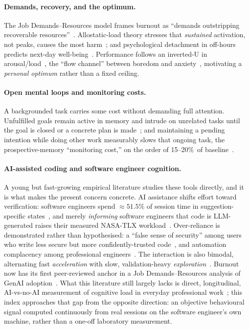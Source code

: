 \documentclass[10pt,twocolumn]{article}
\begin{document}
\paragraph{Demands, recovery, and the optimum.} The Job Demands--Resources model
frames burnout as ``demands outstripping recoverable
resources''~\cite{demerouti2001}. Allostatic-load theory stresses that
\emph{sustained} activation, not peaks, causes the most harm~\cite{mcewen1998}; and
psychological detachment in off-hours predicts next-day
well-being~\cite{sonnentag2007,sonnentag2010}. Performance follows an inverted-U
in arousal/load~\cite{yerkes1908}, the ``flow channel'' between boredom and
anxiety~\cite{csikszentmihalyi1990}, motivating a \emph{personal optimum} rather
than a fixed ceiling.

\paragraph{Open mental loops and monitoring costs.} A backgrounded task carries
some cost without demanding full attention. Unfulfilled goals remain
active in memory and intrude on unrelated tasks until the goal is closed or a
concrete plan is made~\cite{masicampo2011}; and maintaining a pending intention
while doing other work measurably slows that ongoing task, the
prospective-memory ``monitoring cost,'' on the order of 15--20\%\ of
baseline~\cite{smith2003}.

\paragraph{AI-assisted coding and software engineer cognition.} A young but fast-growing
empirical literature studies these tools directly, and it is what makes the
present concern concrete. AI assistance shifts effort
toward verification: software engineers spend $\approx 51.5\%$ of session time in
suggestion-specific states~\cite{mozannar2024}, and merely \emph{informing}
software engineers that code is LLM-generated raises their measured NASA-TLX
workload~\cite{tang2024}. Over-reliance is demonstrated rather than
hypothesised: a ``false sense of security'' among users who write
less secure but more confidently-trusted code~\cite{perry2023}, and automation
complacency among professional engineers~\cite{qian2024}. The interaction
is also bimodal, alternating fast \emph{acceleration} with slow, validation-heavy
\emph{exploration}~\cite{barke2023}. Burnout now has its first peer-reviewed
anchor in a Job Demands--Resources analysis of GenAI
adoption~\cite{feng2026}. What this literature still largely lacks is direct,
longitudinal, AI-vs-no-AI measurement of cognitive load in everyday professional
work~\cite{sergeyuk2026}; this index approaches that gap from the opposite
direction: an objective behavioural signal computed continuously from real
sessions on the software engineer's own machine, rather than a one-off laboratory
measurement.
\end{document}

